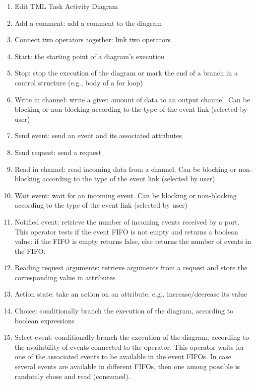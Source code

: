 \documentclass{llncs}
\begin{document}
\begin{enumerate}
	\item Edit TML Task Activity Diagram
	\item Add a comment: add a comment to the diagram
	\item Connect two operators together: link two operators
	\item Start: the starting point of a diagram's execution
    \item Stop: stop the execution of the diagram or mark the end of a branch in a control structure (e.g., body of a
        for loop)
	\item Write in channel: write a given amount of data to an output channel. Can be blocking or non-blocking
	according to the type of the event link (selected by user)
	\item Send event: send an event and its associated attributes
	\item Send request: send a request
	\item Read in channel: read incoming data from a channel. Can be blocking or non-blocking according to the type
	of the event link (selected by user)
	\item Wait event: wait for an incoming event. Can be blocking or non-blocking according to the type of the event
	link (selected by user)
	\item Notified event: retrieve the number of incoming events received by a port. This operator tests if the event
        FIFO is not empty and returns a boolean value: if the FIFO is empty returns false, else returns the number of
        events in the FIFO.
	\item Reading request arguments: retrieve arguments from a request and store the corresponding value in
	attributes
	\item Action state: take an action on an attribute, e.g., increase/decrease its value
	\item Choice: conditionally branch the execution of the diagram, according to boolean expressions
	\item Select event: conditionally branch the execution of the diagram, according to the availability of events
        connected to the operator. This operator waits for one of the associated events to be available in the event
        FIFOs. In case several events are available in different FIFOs, then one among possible is randomly chose and
        read (consumed).%

\end{enumerate}
\end{document}
